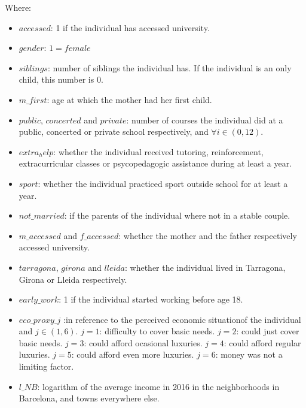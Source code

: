 \documentclass[12pt]{article}
\begin{document}
Where: 
\begin{itemize}
\item $accessed$: 1 if the individual has accessed university.
\item $gender$: $1 = female$
\item $siblings$: number of siblings the individual has. If the individual is an only child, this number is $0$.
\item $m\_{first}$: age at which the mother had her first child.
\item $public$, $concerted$ and $private$: number of courses the individual did at a public, concerted or private school respectively, and $\forall i \in (0, 12)$.
\item $extra_help$: whether the individual received tutoring, reinforcement, extracurricular classes or psycopedagogic assistance during at least a year.
\item $sport$: whether the individual practiced sport outside school for at least a year.
\item $not\_{married}$: if the parents of the individual where not in a stable couple.
\item $m\_{accessed}$ and $f\_{accessed}$: whether the mother and the father respectively accessed university.
\item $tarragona$, $girona$ and $lleida$: whether the individual lived in Tarragona, Girona or Lleida respectively.
\item $early\_{work}$: 1 if the individual started working before age 18.
\item $eco\_{proxy}\_{j}$ :in reference to the perceived economic situationof the individual and $j \in (1, 6)$. 
\subitem{-} $j = 1$: difficulty to cover basic needs.
\subitem{-} $j = 2$: could just cover basic needs.
\subitem{-} $j = 3$: could afford ocasional luxuries.
\subitem{-} $j = 4$: could afford regular luxuries.
\subitem{-} $j = 5$: could afford even more luxuries.
\subitem{-} $j = 6$: money was not a limiting factor.
\item $l\_{NB}$: logarithm of the average income in 2016 in the neighborhoods in Barcelona, and towns everywhere else. 
\end{itemize}
\end{document}
